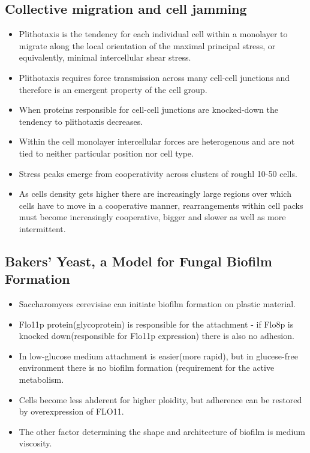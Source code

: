 \documentclass[10pt,a4paper]{article}
\begin{document}
 \subsection{Collective migration and cell jamming\cite{fjj13}}
 \begin{itemize}
  \item Plithotaxis is the tendency for each individual cell within a monolayer to migrate along the local orientation of the maximal principal stress,
  or equivalently, minimal intercellular shear stress.
  \item Plithotaxis requires force transmission across many cell-cell junctions and therefore is an emergent property of the cell group.
  \item When proteins responsible for cell-cell junctions are knocked-down the tendency to plithotaxis decreases.
  \item  Within the cell monolayer intercellular forces are heterogenous and are not tied to neither particular position nor cell type.
  \item Stress peaks emerge from cooperativity across clusters of roughl 10-50 cells.
  \item As cells density gets higher there are increasingly large regions over which cells have to move 
  in a cooperative manner, rearrangements within cell packs must become increasingly cooperative, bigger and slower as well as more intermittent.
 \end{itemize}

 \subsection{Bakers’ Yeast, a Model for Fungal Biofilm Formation\cite{fink01}}
 \begin{itemize}
  \item Saccharomyces cerevisiae can initiate biofilm formation on plastic material.
  \item Flo11p protein(glycoprotein) is responsible for the attachment - if Flo8p is knocked down(responsible for Flo11p expression) there is also no adhesion.
  \item In low-glucose medium attachment is easier(more rapid), but in glucese-free environment there is no biofilm formation (requirement for the active metabolism.
  \item Cells become less ahderent for higher ploidity, but adherence can be restored by overexpression of FLO11.
  \item The other factor determining the shape and architecture of biofilm is medium viscosity.
 \end{itemize}




\thispagestyle{empty} %




\clearpage
\end{document}
